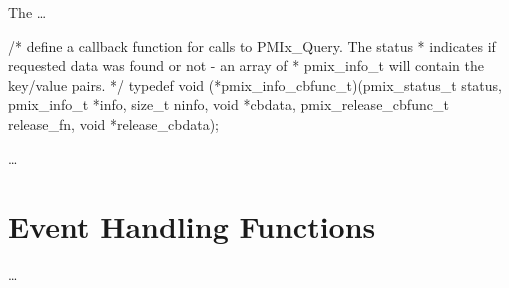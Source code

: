 The  \ldots

\cspecificstart
\begin{codepar}
/* define a callback function for calls to PMIx_Query. The status
 * indicates if requested data was found or not - an array of
 * pmix_info_t will contain the key/value pairs. */
typedef void (*pmix_info_cbfunc_t)(pmix_status_t status,
                                   pmix_info_t *info, size_t ninfo,
                                   void *cbdata,
                                   pmix_release_cbfunc_t release_fn,
                                   void *release_cbdata);
\end{codepar}
\cspecificend

\descr

\ldots


\section{Event Handling Functions}

\ldots

\subsection{}

